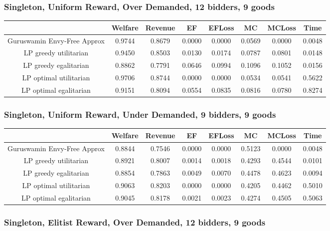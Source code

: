\subsubsection*{Singleton, Uniform Reward, Over Demanded, 12 bidders, 9 goods} 
\begin{tabular}{|c|c|c|c|c|c|c|c|}\hline
                            	&Welfare	&Revenue	&EF	&EFLoss	&MC	&MCLoss	&Time	\\\hline
   Guruswamin Envy-Free Approx	&0.9744	&0.8679	&0.0000	&0.0000	&0.0569	&0.0000	&0.0048	\\\hline 
         LP greedy utilitarian	&0.9450	&0.8503	&0.0130	&0.0174	&0.0787	&0.0801	&0.0148	\\\hline 
         LP greedy egalitarian	&0.8862	&0.7791	&0.0646	&0.0994	&0.1096	&0.1052	&0.0156	\\\hline 
        LP optimal utilitarian	&0.9706	&0.8744	&0.0000	&0.0000	&0.0534	&0.0541	&0.5622	\\\hline 
        LP optimal egalitarian	&0.9151	&0.8094	&0.0554	&0.0835	&0.0816	&0.0780	&0.8274	\\\hline 
\end{tabular}\subsubsection*{Singleton, Uniform Reward, Under Demanded, 9 bidders, 9 goods} 
\begin{tabular}{|c|c|c|c|c|c|c|c|}\hline
                            	&Welfare	&Revenue	&EF	&EFLoss	&MC	&MCLoss	&Time	\\\hline
   Guruswamin Envy-Free Approx	&0.8844	&0.7546	&0.0000	&0.0000	&0.5123	&0.0000	&0.0048	\\\hline 
         LP greedy utilitarian	&0.8921	&0.8007	&0.0014	&0.0018	&0.4293	&0.4544	&0.0101	\\\hline 
         LP greedy egalitarian	&0.8854	&0.7863	&0.0049	&0.0070	&0.4478	&0.4623	&0.0094	\\\hline 
        LP optimal utilitarian	&0.9063	&0.8203	&0.0000	&0.0000	&0.4205	&0.4462	&0.5010	\\\hline 
        LP optimal egalitarian	&0.9045	&0.8178	&0.0021	&0.0023	&0.4274	&0.4505	&0.5063	\\\hline 
\end{tabular}\subsubsection*{Singleton, Elitist Reward, Over Demanded, 12 bidders, 9 goods} 
